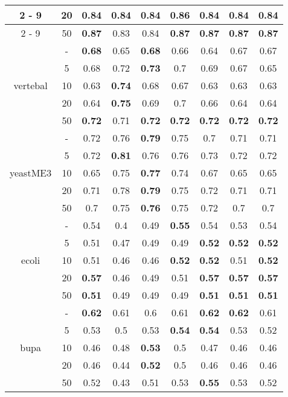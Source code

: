 \documentclass{article}%
\begin{document}
\begin{longtable}{c|c|ccccccc}
\cline{2%
-%
9}%
&20&0.84&0.84&0.84&\textbf{0.86}&0.84&0.84&0.84\\%
\cline{2%
-%
9}%
&50&\textbf{0.87}&0.83&0.84&\textbf{0.87}&\textbf{0.87}&\textbf{0.87}&\textbf{0.87}\\%
\hline%
\multirow{5}{*}{vertebal}&{-}&\textbf{0.68}&0.65&\textbf{0.68}&0.66&0.64&0.67&0.67\\%
\cline{2%
-%
9}%
&5&0.68&0.72&\textbf{0.73}&0.7&0.69&0.67&0.65\\%
\cline{2%
-%
9}%
&10&0.63&\textbf{0.74}&0.68&0.67&0.63&0.63&0.63\\%
\cline{2%
-%
9}%
&20&0.64&\textbf{0.75}&0.69&0.7&0.66&0.64&0.64\\%
\cline{2%
-%
9}%
&50&\textbf{0.72}&0.71&\textbf{0.72}&\textbf{0.72}&\textbf{0.72}&\textbf{0.72}&\textbf{0.72}\\%
\hline%
\multirow{5}{*}{yeastME3}&{-}&0.72&0.76&\textbf{0.79}&0.75&0.7&0.71&0.71\\%
\cline{2%
-%
9}%
&5&0.72&\textbf{0.81}&0.76&0.76&0.73&0.72&0.72\\%
\cline{2%
-%
9}%
&10&0.65&0.75&\textbf{0.77}&0.74&0.67&0.65&0.65\\%
\cline{2%
-%
9}%
&20&0.71&0.78&\textbf{0.79}&0.75&0.72&0.71&0.71\\%
\cline{2%
-%
9}%
&50&0.7&0.75&\textbf{0.76}&0.75&0.72&0.7&0.7\\%
\hline%
\multirow{5}{*}{ecoli}&{-}&0.54&0.4&0.49&\textbf{0.55}&0.54&0.53&0.54\\%
\cline{2%
-%
9}%
&5&0.51&0.47&0.49&0.49&\textbf{0.52}&\textbf{0.52}&\textbf{0.52}\\%
\cline{2%
-%
9}%
&10&0.51&0.46&0.46&\textbf{0.52}&\textbf{0.52}&0.51&\textbf{0.52}\\%
\cline{2%
-%
9}%
&20&\textbf{0.57}&0.46&0.49&0.51&\textbf{0.57}&\textbf{0.57}&\textbf{0.57}\\%
\cline{2%
-%
9}%
&50&\textbf{0.51}&0.49&0.49&0.49&\textbf{0.51}&\textbf{0.51}&\textbf{0.51}\\%
\hline%
\multirow{5}{*}{bupa}&{-}&\textbf{0.62}&0.61&0.6&0.61&\textbf{0.62}&\textbf{0.62}&0.61\\%
\cline{2%
-%
9}%
&5&0.53&0.5&0.53&\textbf{0.54}&\textbf{0.54}&0.53&0.52\\%
\cline{2%
-%
9}%
&10&0.46&0.48&\textbf{0.53}&0.5&0.47&0.46&0.46\\%
\cline{2%
-%
9}%
&20&0.46&0.44&\textbf{0.52}&0.5&0.46&0.46&0.46\\%
\cline{2%
-%
9}%
&50&0.52&0.43&0.51&0.53&\textbf{0.55}&0.53&0.52\\%

\end{longtable}
\end{document}
